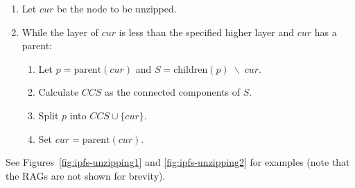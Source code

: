 \begin{enumerate}

\item Let $\mathit{cur}$ be the node to be unzipped.
\item While the layer of $\mathit{cur}$ is less than the specified higher layer and $\mathit{cur}$ has a parent:

\begin{enumerate}
\item Let $p = \mbox{parent}(\mathit{cur})$ and $S = \mbox{children}(p) \; \backslash \; \mathit{cur}$.
\item Calculate $\mathit{CCS}$ as the connected components of $S$.
\item Split $p$ into $\mathit{CCS} \cup \{\mathit{cur}\}$.
\item Set $\mathit{cur} = \mbox{parent}(\mathit{cur})$.
\end{enumerate}

\end{enumerate}

\noindent See Figures~\ref{fig:ipfs-unzipping1} and \ref{fig:ipfs-unzipping2} for examples (note that the RAGs are not shown for brevity).

